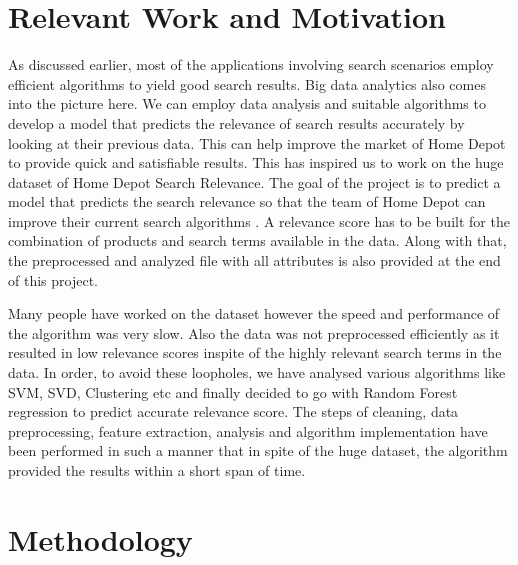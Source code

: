 \documentclass{sig-alternate-05-2015}
\begin{document}
\section{Relevant Work and Motivation}
 As discussed earlier, most of the applications involving search scenarios employ efficient algorithms to yield good search results. Big data analytics also comes into the picture here. We can employ data analysis and suitable algorithms to develop a model that predicts the relevance of search results accurately by looking at their previous data. This can help improve the market of Home Depot to provide quick and satisfiable results. This has inspired us to work on the huge dataset of Home Depot Search Relevance. The goal of the project is to predict a model that predicts the search relevance so that the team of Home Depot can improve their current search algorithms\cite{www-homeDepo} . A relevance score has to be built for the combination of products and search terms available in the data. Along with that, the preprocessed and analyzed file with all attributes is also provided at the end of this project.
 
 Many people have worked on the dataset however the speed and performance of the algorithm was very slow. Also the data was not preprocessed efficiently as it resulted in low relevance scores inspite of the highly relevant search terms in the data. In order, to avoid these loopholes, we have analysed various algorithms like SVM, SVD, Clustering etc and finally decided to go with Random Forest regression to predict accurate relevance score. The steps of cleaning, data preprocessing, feature extraction, analysis and algorithm implementation have been performed in such a manner that in spite of the huge dataset, the algorithm provided the results within a short span of time.
\newline

\section{Methodology}
\newline 
\end{document}
